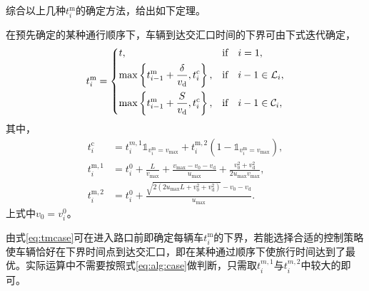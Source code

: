 综合以上几种$t_i^\mathrm{m}$的确定方法，给出如下定理。
\begin{theorem}
在预先确定的某种通行顺序下，车辆到达交汇口时间的下界可由下式迭代确定，
\begin{equation}
t_i^\mathrm{m}=
\begin{dcases}
t, & \text{if}\quad i=1,\\
\max \left\{t_{i-1}^\mathrm{m} + \frac{\delta}{v_\mathrm{d}}, t_i^\mathrm{c}\right\}, & \text{if}\quad i-1\in \mathcal{L}_i,\\
\max \left\{t_{i-1}^\mathrm{m} + \frac{S}{v_\mathrm{d}}, t_i^\mathrm{c}\right\}, & \text{if}\quad i-1\in \mathcal{C}_i,
\end{dcases}
\label{eq:tmcase}
\end{equation}
其中，
\begin{align}
t_i^\mathrm{c}&=t_i^{m,1}\mathds{1}_{v_i^\mathrm{m}=v_{\max}}+t_i^\mathrm{m,2}(1-\mathds{1}_{v_i^\mathrm{m}=v_{\max}}),\label{eq:alg:case}\\
t_i^\mathrm{m,1}&=t_i^0 + \frac{L}{v_{\max}} + \frac{v_{\max}-v_0-v_\mathrm{d}}{u_{\max}} + \frac{v_0^2+v_\mathrm{d}^2}{2u_{\max}v_{\max}},\\
t_i^\mathrm{m,2}&=t_i^0+\frac{\sqrt{2(2u_{\max}L+v_0^2+v_\mathrm{d}^2)}-v_0-v_\mathrm{d}}{u_{\max}}.
\end{align}
上式中$v_0 = v_i^0$。
\end{theorem}

由式\eqref{eq:tmcase}可在进入路口前即确定每辆车$t_i^\mathrm{m}$的下界，若能选择合适的控制策略使车辆恰好在下界时间点到达交汇口，即在某种通过顺序下使旅行时间达到了最优。实际运算中不需要按照式\eqref{eq:alg:case}做判断，只需取$t_i^{m,1}$与$t_i^{m,2}$中较大的即可。

